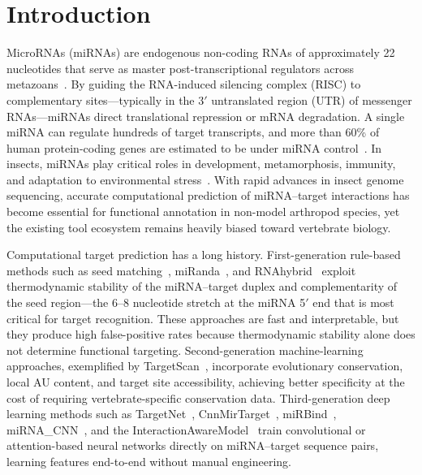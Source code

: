 \documentclass[10pt,a4paper]{article}
\begin{document}
\vspace{1em}

\section{Introduction}

MicroRNAs (miRNAs) are endogenous non-coding RNAs of approximately 22 nucleotides that serve as master post-transcriptional regulators across metazoans~\citep{bartel2009, bartel2018}. By guiding the RNA-induced silencing complex (RISC) to complementary sites---typically in the 3$'$ untranslated region (UTR) of messenger RNAs---miRNAs direct translational repression or mRNA degradation. A single miRNA can regulate hundreds of target transcripts, and more than 60\% of human protein-coding genes are estimated to be under miRNA control~\citep{bartel2018}. In insects, miRNAs play critical roles in development, metamorphosis, immunity, and adaptation to environmental stress~\citep{asgari2013insect, lucas2013insect}. With rapid advances in insect genome sequencing, accurate computational prediction of miRNA--target interactions has become essential for functional annotation in non-model arthropod species, yet the existing tool ecosystem remains heavily biased toward vertebrate biology.

Computational target prediction has a long history. First-generation rule-based methods such as seed matching~\citep{bartel2009}, miRanda~\citep{enright2003miranda}, and RNAhybrid~\citep{rehmsmeier2004rnahybrid} exploit thermodynamic stability of the miRNA--target duplex and complementarity of the seed region---the 6--8 nucleotide stretch at the miRNA 5$'$ end that is most critical for target recognition. These approaches are fast and interpretable, but they produce high false-positive rates because thermodynamic stability alone does not determine functional targeting. Second-generation machine-learning approaches, exemplified by TargetScan~\citep{agarwal2015targetscan, mcgeary2019targetscan}, incorporate evolutionary conservation, local AU content, and target site accessibility, achieving better specificity at the cost of requiring vertebrate-specific conservation data. Third-generation deep learning methods such as TargetNet~\citep{min2022targetnet}, CnnMirTarget~\citep{zheng2020cnnmirtarget}, miRBind~\citep{klimentova2022mirbind}, miRNA\_CNN~\citep{hejret2023chimeric}, and the InteractionAwareModel~\citep{yang2024interaction} train convolutional or attention-based neural networks directly on miRNA--target sequence pairs, learning features end-to-end without manual engineering.
\end{document}
